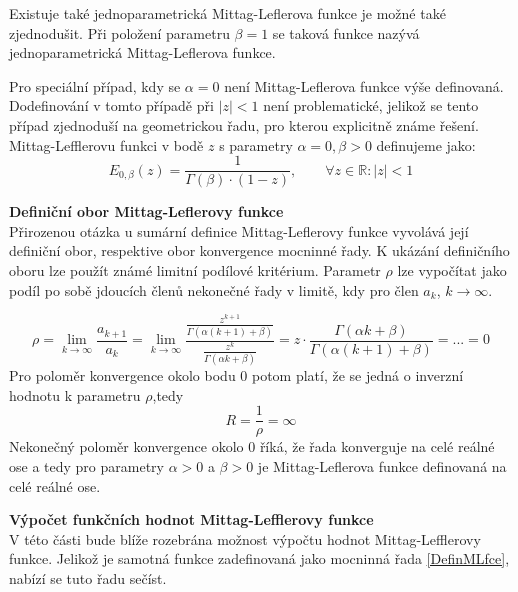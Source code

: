 \documentclass[a4paper,12pt,twoside]{article}
\theoremstyle{definition}
\newtheorem{defin}[veta]{Definice}
\theoremstyle{remark}
\numberwithin{equation}{section}
\numberwithin{table}{section}
\numberwithin{figure}{section}
\newcommand{\R}{\mathbb{R}}
\begin{document}
Existuje také jednoparametrická Mittag-Leflerova funkce je možné také zjednodušit. Při položení parametru $\beta = 1$ se taková funkce nazývá jednoparametrická Mittag-Leflerova funkce.


Pro speciální případ, kdy se $\alpha = 0$ není Mittag-Leflerova funkce výše definovaná. Dodefinování v tomto případě při $|z| < 1$ není problematické, jelikož se tento případ zjednoduší na geometrickou řadu, pro kterou explicitně známe řešení. Mittag-Lefflerovu funkci v bodě $z$ s parametry $\alpha = 0, \beta > 0$ definujeme jako:
\begin{equation}
	E_{0, \beta}\left(z\right) = \frac{1}{\Gamma \left(\beta\right)\cdot \left(1-z\right)}, \qquad \forall z \in \R: |z| < 1
\end{equation}

\textbf{Definiční obor Mittag-Leflerovy funkce} \\
Přirozenou otázka u sumární definice Mittag-Leflerovy funkce vyvolává její definiční obor, respektive obor konvergence mocninné řady. 
K ukázání definičního oboru lze použít známé limitní podílové kritérium. Parametr $\rho$ lze vypočítat jako podíl po sobě jdoucích členů nekonečné řady v limitě, kdy pro člen $a_k$, $k \rightarrow \infty $.

$$\rho = \lim_{k\to\infty} \frac{a_{k+1} }{a_{k}} = \lim_{k\to\infty} \frac{\frac{z^{k+1}}{\Gamma\left( \alpha \left(k+1\right) +\beta \right)}}{\frac{z^{k}}{\Gamma\left( \alpha k +\beta \right)} } = z \cdot \frac{\Gamma\left( \alpha k +\beta \right)}{\Gamma\left( \alpha \left(k+1\right) +\beta \right)} = ... = 0$$
Pro poloměr konvergence okolo bodu 0 potom platí, že se jedná o inverzní hodnotu k parametru $\rho$,tedy
$$R = \frac{1}{\rho} = \infty$$
Nekonečný poloměr konvergence okolo $0$ říká, že řada konverguje na celé reálné ose a tedy pro parametry $\alpha > 0$ a $\beta > 0$ je Mittag-Leflerova funkce definovaná na celé reálné ose.

\textbf{Výpočet funkčních hodnot Mittag-Lefflerovy funkce}\label{DefOMLfce} \\
V této části bude blíže rozebrána možnost výpočtu hodnot Mittag-Lefflerovy funkce. Jelikož je samotná funkce zadefinovaná jako mocninná řada \eqref{DefinMLfce}, nabízí se tuto řadu sečíst.
\end{document}
